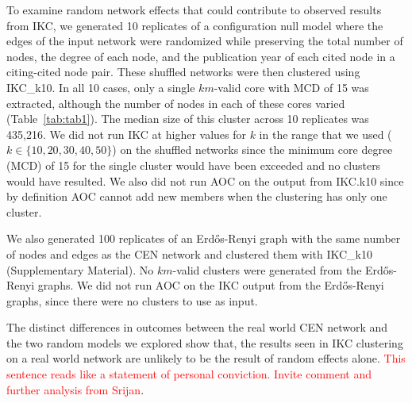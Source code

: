 \documentclass[12pt, oneside]{article}   	%
\begin{document}
	To examine random network effects that could contribute to observed results from IKC, we generated 10 replicates of a configuration null model where the edges of the input network were randomized while preserving the total number of nodes, the degree of each node,  and the publication year of each cited node in a citing-cited node pair. These shuffled networks were then clustered using IKC\_k10. In all 10 cases, only a single $km$-valid core with MCD of 15 was extracted, although the number of nodes in each of these cores varied (Table~\ref{tab:tab1}). The median size of this cluster across 10 replicates was 435,216. We did not run IKC at higher values for $k$ in the range that we used ($k \in {\{10,20,30,40, 50\}}$) on the shuffled networks since  the minimum core degree (MCD) of 15 for the single cluster would have been exceeded and no clusters would have resulted.
	We also did not run AOC on the output from IKC.k10 since by definition AOC cannot add new members when the clustering has only one cluster. 
	
	
	We also generated 100 replicates of an Erd\H{o}s-Renyi graph with the same number of nodes and edges as the CEN network and clustered them with IKC\_k10 (Supplementary Material). No $km$-valid clusters were generated from the Erd\H{o}s-Renyi graphs. We did not run AOC on the IKC output from  the Erd\H{o}s-Renyi graphs, since there were no clusters to use as input. 
	
	
	The distinct differences in outcomes between the real world CEN network and the two random models we explored show that, the results seen in IKC clustering on a real world network are unlikely to be the result of random effects alone. \textcolor{red}{This sentence reads like a statement of personal conviction. Invite comment and further analysis from Srijan}.
	
	
	
\end{document}
